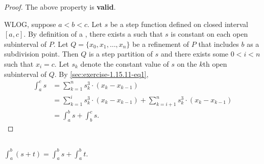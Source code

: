 \documentclass{report}
\begin{document}
\begin{proof}

  The above property is \textbf{valid}.

  \vspace{6pt}

  WLOG, suppose $a < b < c$.
  Let $s$ be a step function defined on closed interval $[a, c]$.
  By definition of a , there exists a
     such that $s$ is constant on each open
    subinterval of $P$.
  Let $Q = \{x_0, x_1, \ldots, x_n\}$ be a refinement of $P$ that includes $b$
    as a subdivision point.
  Then $Q$ is a step partition of $s$ and there exists some $0 < i < n$ such
    that $x_i = c$.
  Let $s_k$ denote the constant value of $s$ on the $k$th open subinterval of
    $Q$.
  By \eqref{sec:exercise-1.15.11-eq1},
    \begin{align*}
      \int_a^c s
        & = \sum_{k=1}^n s_k^3 \cdot (x_k - x_{k-1}) \\
        & = \sum_{k=1}^i s_k^3 \cdot (x_k - x_{k-1}) +
            \sum_{k=i+1}^n s_k^3 \cdot (x_k - x_{k-1}) \\
        & = \int_a^b s + \int_b^c s.
    \end{align*}

\end{proof}

\subsection{}%
\label{sub:exercise-1.15.11b}

$\int_a^b (s + t) = \int_a^b s + \int_a^b t$.

\end{document}

